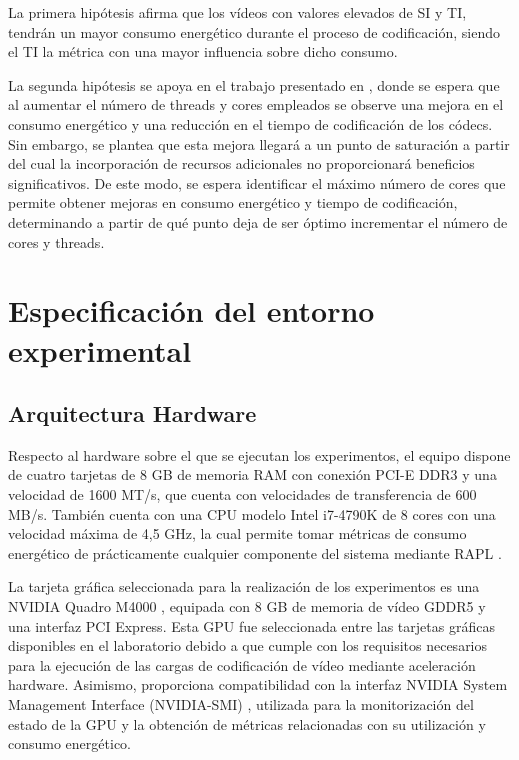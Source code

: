  La primera hipótesis afirma que los vídeos con valores elevados de SI y TI, tendrán un mayor consumo energético durante el proceso de codificación, siendo el TI la métrica con una mayor influencia sobre dicho consumo.
 
 La segunda hipótesis se apoya en el trabajo presentado en \cite{multithread-energy-consumption-videoencoding}, donde se espera que al aumentar el número de threads y cores empleados se observe una mejora en el consumo energético y una reducción en el tiempo de codificación de los códecs. Sin embargo, se plantea que esta mejora llegará a un punto de saturación a partir del cual la incorporación de recursos adicionales no proporcionará beneficios significativos. De este modo, se espera identificar el máximo número de cores que permite obtener mejoras en consumo energético y tiempo de codificación, determinando a partir de qué punto deja de ser óptimo incrementar el número de cores y threads.



\section{Especificación del entorno experimental}
\subsection{Arquitectura Hardware}
 Respecto al hardware sobre el que se ejecutan los experimentos, el equipo dispone de cuatro tarjetas de 8 GB de memoria RAM con conexión PCI-E DDR3 y una velocidad de 1600 MT/s, que cuenta con velocidades de transferencia de 600 MB/s. También cuenta con una CPU modelo Intel i7-4790K de 8 cores con una velocidad máxima de 4,5 GHz, la cual permite tomar métricas de consumo energético de prácticamente cualquier componente del sistema mediante RAPL \cite{intel-processor-sepcts}.

 La tarjeta gráfica seleccionada para la realización de los experimentos es una NVIDIA Quadro M4000 \cite{nvidia-quadro-m4000}, equipada con 8 GB de memoria de vídeo GDDR5 y una interfaz PCI Express. Esta GPU fue seleccionada entre las tarjetas gráficas disponibles en el laboratorio debido a que cumple con los requisitos necesarios para la ejecución de las cargas de codificación de vídeo mediante aceleración hardware. Asimismo, proporciona compatibilidad con la interfaz NVIDIA System Management Interface (NVIDIA-SMI) \cite{nvidia-smi}, utilizada para la monitorización del estado de la GPU y la obtención de métricas relacionadas con su utilización y consumo energético.
 
